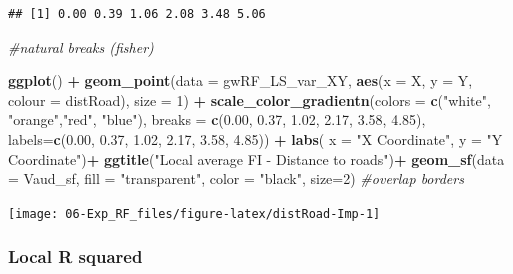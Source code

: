 \documentclass[
]{article}
\newenvironment{Shaded}{\begin{snugshade}}{\end{snugshade}}
\newcommand{\AttributeTok}[1]{\textcolor[rgb]{0.13,0.29,0.53}{#1}}
\newcommand{\CommentTok}[1]{\textcolor[rgb]{0.56,0.35,0.01}{\textit{#1}}}
\newcommand{\DecValTok}[1]{\textcolor[rgb]{0.00,0.00,0.81}{#1}}
\newcommand{\FloatTok}[1]{\textcolor[rgb]{0.00,0.00,0.81}{#1}}
\newcommand{\FunctionTok}[1]{\textcolor[rgb]{0.13,0.29,0.53}{\textbf{#1}}}
\newcommand{\NormalTok}[1]{#1}
\newcommand{\SpecialCharTok}[1]{\textcolor[rgb]{0.81,0.36,0.00}{\textbf{#1}}}
\newcommand{\StringTok}[1]{\textcolor[rgb]{0.31,0.60,0.02}{#1}}
\begin{document}
\begin{verbatim}
## [1] 0.00 0.39 1.06 2.08 3.48 5.06
\end{verbatim}

\begin{Shaded}
\begin{Highlighting}[]
\CommentTok{\#natural breaks (fisher)}

\FunctionTok{ggplot}\NormalTok{() }\SpecialCharTok{+}
    \FunctionTok{geom\_point}\NormalTok{(}\AttributeTok{data =}\NormalTok{ gwRF\_LS\_var\_XY, }\FunctionTok{aes}\NormalTok{(}\AttributeTok{x =}\NormalTok{ X, }\AttributeTok{y =}\NormalTok{ Y, }\AttributeTok{colour =}\NormalTok{ distRoad), }\AttributeTok{size =} \DecValTok{1}\NormalTok{) }\SpecialCharTok{+}
    \FunctionTok{scale\_color\_gradientn}\NormalTok{(}\AttributeTok{colors =} \FunctionTok{c}\NormalTok{(}\StringTok{"white"}\NormalTok{, }\StringTok{"orange"}\NormalTok{,}\StringTok{"red"}\NormalTok{, }\StringTok{"blue"}\NormalTok{), }
                       \AttributeTok{breaks =} \FunctionTok{c}\NormalTok{(}\FloatTok{0.00}\NormalTok{, }\FloatTok{0.37}\NormalTok{, }\FloatTok{1.02}\NormalTok{, }\FloatTok{2.17}\NormalTok{, }\FloatTok{3.58}\NormalTok{, }\FloatTok{4.85}\NormalTok{), }
                       \AttributeTok{labels=}\FunctionTok{c}\NormalTok{(}\FloatTok{0.00}\NormalTok{, }\FloatTok{0.37}\NormalTok{, }\FloatTok{1.02}\NormalTok{, }\FloatTok{2.17}\NormalTok{, }\FloatTok{3.58}\NormalTok{, }\FloatTok{4.85}\NormalTok{)) }\SpecialCharTok{+}
    \FunctionTok{labs}\NormalTok{( }\AttributeTok{x =} \StringTok{"X Coordinate"}\NormalTok{, }\AttributeTok{y =} \StringTok{"Y Coordinate"}\NormalTok{)}\SpecialCharTok{+}
    \FunctionTok{ggtitle}\NormalTok{(}\StringTok{"Local average FI {-} Distance to roads"}\NormalTok{)}\SpecialCharTok{+}
    \FunctionTok{geom\_sf}\NormalTok{(}\AttributeTok{data =}\NormalTok{ Vaud\_sf, }\AttributeTok{fill =} \StringTok{"transparent"}\NormalTok{, }\AttributeTok{color =} \StringTok{"black"}\NormalTok{, }\AttributeTok{size=}\DecValTok{2}\NormalTok{) }\CommentTok{\#overlap borders}
\end{Highlighting}
\end{Shaded}

\begin{center}\texttt{[image: 06-Exp\_RF\_files/figure-latex/distRoad-Imp-1]} \end{center}

\subsubsection{Local R squared}\label{local-r-squared}
\end{document}
